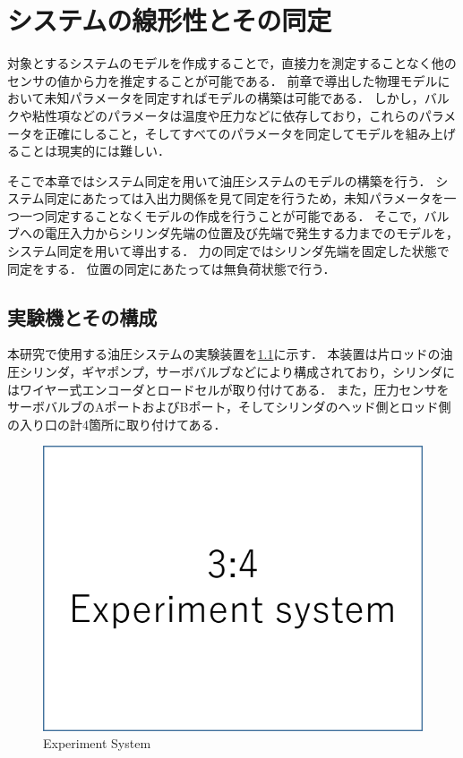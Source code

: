 \chapter{システムの線形性とその同定}
\label{sec:SystemIdentification}
対象とするシステムのモデルを作成することで，直接力を測定することなく他のセンサの値から力を推定することが可能である．
前章で導出した物理モデルにおいて未知パラメータを同定すればモデルの構築は可能である．
しかし，バルクや粘性項などのパラメータは温度や圧力などに依存しており，これらのパラメータを正確にしること，そしてすべてのパラメータを同定してモデルを組み上げることは現実的には難しい．

そこで本章ではシステム同定を用いて油圧システムのモデルの構築を行う．
システム同定にあたっては入出力関係を見て同定を行うため，未知パラメータを一つ一つ同定することなくモデルの作成を行うことが可能である．
そこで，バルブへの電圧入力からシリンダ先端の位置及び先端で発生する力までのモデルを，システム同定を用いて導出する．
力の同定ではシリンダ先端を固定した状態で同定をする．
位置の同定にあたっては無負荷状態で行う．
\section{実験機とその構成}
本研究で使用する油圧システムの実験装置を\figname\ref{fig:ExperimentSystem}に示す．
本装置は片ロッドの油圧シリンダ，ギヤポンプ，サーボバルブなどにより構成されており，シリンダにはワイヤー式エンコーダとロードセルが取り付けてある．
また，圧力センサをサーボバルブのAポートおよびBポート，そしてシリンダのヘッド側とロッド側の入り口の計4箇所に取り付けてある．
\begin{figure}[t]
    \centering
        \includegraphics[keepaspectratio, scale=1.0]{contents/SystemIdentification/figure/3-4ExperimentSystem.png}
        \caption{Experiment System}
        \label{fig:ExperimentSystem}
\end{figure}

